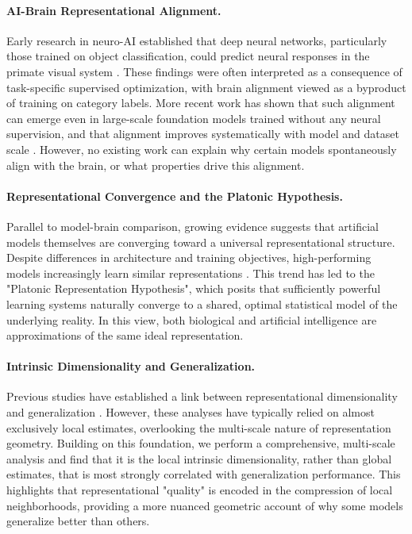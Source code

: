 \documentclass{article}
\makeatletter
\newcommand{\Junjie}[1]{\textcolor{purple}{@Junjie: #1}}
\theoremstyle{plain}
\theoremstyle{definition}
\theoremstyle{remark}
\makeatother
\begin{document}
\paragraph{AI-Brain Representational Alignment.}
Early research in neuro-AI established that deep neural networks, particularly those trained on object classification, could predict neural responses in the primate visual system \citep{yamins2014performance, khaligh2014deep, gucclu2015deep, eickenberg2017seeing, schrimpf2021neural}. These findings were often interpreted as a consequence of task-specific supervised optimization, with brain alignment viewed as a byproduct of training on category labels. More recent work has shown that such alignment can emerge even in large-scale foundation models trained without any neural supervision, and that alignment improves systematically with model and dataset scale \citep{wang2023better, conwell2024large, shen2024towards, raugel2025disentangling}. However, no existing work can explain why certain models spontaneously align with the brain, or what properties drive this alignment.


\paragraph{Representational Convergence and the Platonic Hypothesis.}
Parallel to model-brain comparison, growing evidence suggests that artificial models themselves are converging toward a universal representational structure. Despite differences in architecture and training objectives, high-performing models increasingly learn similar representations \citep{huh2024position}. This trend has led to the "Platonic Representation Hypothesis", which posits that sufficiently powerful learning systems naturally converge to a shared, optimal statistical model of the underlying reality. In this view, both biological and artificial intelligence are approximations of the same ideal representation.



\paragraph{Intrinsic Dimensionality and Generalization.}
Previous studies have established a link between representational dimensionality and generalization \citep{ansuini2019intrinsic, sharma2022scaling}. However, these analyses have typically relied on almost exclusively local estimates, overlooking the multi-scale nature of representation geometry. Building on this foundation, we perform a comprehensive, multi-scale analysis and find that it is the local intrinsic dimensionality, rather than global estimates, that is most strongly correlated with generalization performance. This highlights that representational "quality" is encoded in the compression of local neighborhoods, providing a more nuanced geometric account of why some models generalize better than others.
\end{document}
